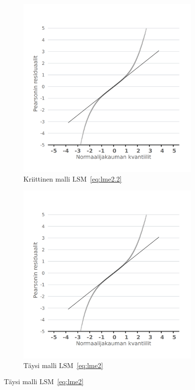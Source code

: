 \documentclass[finnish]{docopts}
\begin{document}
\begin{figure}[H]
\centering
\begin{subfigure}[b]{0.4\textwidth}
\centering
  \includegraphics[width=.8\linewidth]{kuvaajat/lme3_qq.png}
  \caption{Kriittinen malli $\text{LSM}$~\ref{eq:lme2.2}}
  \label{fig:lme_krit_qq}
\end{subfigure}%
\begin{subfigure}[b]{0.4\textwidth}
\centering
  \includegraphics[width=.8\linewidth]{kuvaajat/lme3_full_qq.png}
  \caption{Täysi malli $\text{LSM}$~\ref{eq:lme2}}
  \label{fig:lme_taysi_qq}
\end{subfigure}

\end{figure}
\end{document}
